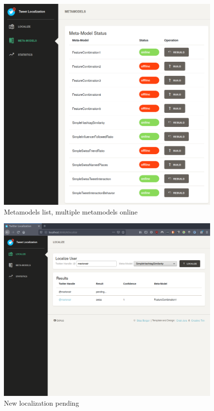 \documentclass[10pt,a4paper]{article}
\begin{document}
\begin{figure}
	\centering
	\includegraphics[scale=0.3]{metamodels-built}
	\caption{Metamodels list, multiple metamodels online}
	\label{fig:metamodels-built}
\end{figure}

\begin{figure}
	\centering
	\includegraphics[scale=0.25]{localize-one-pending}
	\caption{New localization pending}
	\label{fig:localize-one-pending}
\end{figure}
\end{document}
